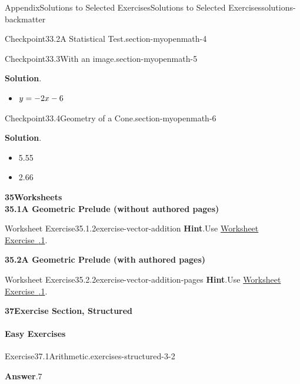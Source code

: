 \documentclass[twoside,10pt,]{article}
\newcommand{\blocktitlefont}{\relax}
\newcommand{\xreffont}{\relax}
\numberwithin{equation}{section}
\begin{document}
\begin{solutions-section}{Appendix}{Solutions to Selected Exercises}{}{Solutions to Selected Exercises}{}{}{solutions-backmatter}
\begin{inlinesolution}{Checkpoint}{33.2}{A Statistical Test.}{section-myopenmath-4}
\begin{itemize}[label=\textbullet]
\end{itemize}
%
\end{inlinesolution}%
\begin{inlinesolution}{Checkpoint}{33.3}{With an image.}{section-myopenmath-5}%
\par\smallskip%
\noindent\textbf{\blocktitlefont Solution}.\hypertarget{section-myopenmath-5-3-back}{}\quad{}%
\begin{itemize}[label=\textbullet]
\item{}\(\displaystyle \displaystyle{y}=-{2}{x}-{6}\)%
\end{itemize}
%
\end{inlinesolution}%
\begin{inlinesolution}{Checkpoint}{33.4}{Geometry of a Cone.}{section-myopenmath-6}%
\par\smallskip%
\noindent\textbf{\blocktitlefont Solution}.\hypertarget{section-myopenmath-6-3-back}{}\quad{}%
\begin{itemize}[label=\textbullet]
\item{}5.55%
\item{}2.66%
\end{itemize}
%
\end{inlinesolution}%
\par\medskip
\noindent\textbf{\large{}35\space\textperiodcentered\space{}Worksheets\\
35.1\space\textperiodcentered\space{}A Geometric Prelude (without authored pages)}
\begin{divisionsolution}{Worksheet Exercise}{35.1.2}{}{exercise-vector-addition}%
\noindent\textbf{\blocktitlefont Hint}.\hypertarget{exercise-vector-addition-2-back}{}\quad{}Use \hyperlink{ex-cyclic}{Worksheet Exercise~{\xreffont 35.1.1}}.%
\end{divisionsolution}%
\par\medskip
\noindent\textbf{\large{}35.2\space\textperiodcentered\space{}A Geometric Prelude (with authored pages)}
\begin{divisionsolution}{Worksheet Exercise}{35.2.2}{}{exercise-vector-addition-pages}%
\noindent\textbf{\blocktitlefont Hint}.\hypertarget{exercise-vector-addition-pages-2-back}{}\quad{}Use \hyperlink{ex-cyclic}{Worksheet Exercise~{\xreffont 35.1.1}}.%
\end{divisionsolution}%
\par\medskip
\noindent\textbf{\large{}37\space\textperiodcentered\space{}Exercise Section, Structured}
\paragraph[{Easy Exercises}]{Easy Exercises}
\begin{divisionsolution}{Exercise}{37.1}{Arithmetic.}{exercises-structured-3-2}%
\par\smallskip%
\noindent\textbf{\blocktitlefont Answer}.\hypertarget{exercises-structured-3-2-3-back}{}\quad{}\(7\)%
\end{divisionsolution}%
\par\medskip\noindent

\end{solutions-section}
\end{document}

